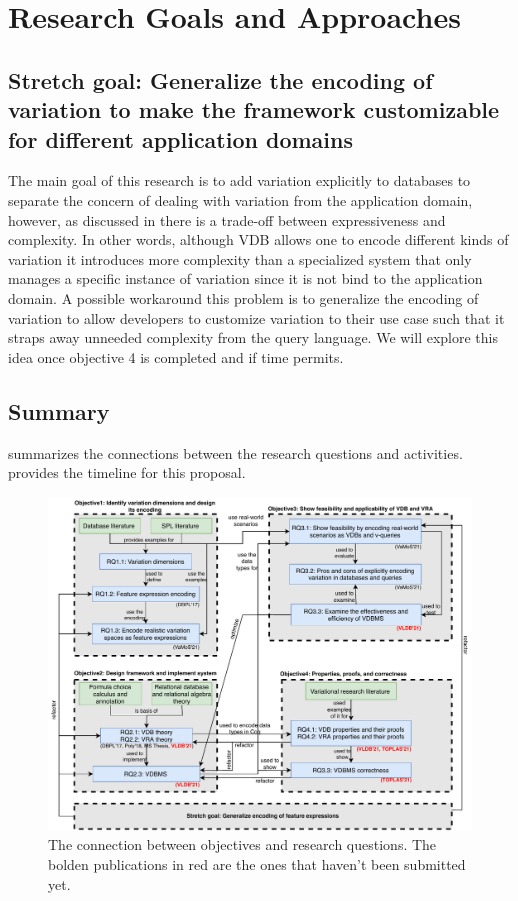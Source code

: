 \section{Research Goals and Approaches}
\label{sec:goals}







\subsection{Stretch goal: Generalize the encoding of variation to make the framework
customizable for different application domains}
\label{sec:ro5}

The main goal of this research is to add variation explicitly to 
databases to separate the concern of dealing with variation from the application
domain, however, as discussed in  there is a trade-off between 
 expressiveness and complexity. In other words, although VDB allows 
one to encode different kinds of variation it introduces more complexity than a
specialized system that only manages a specific instance of variation
since it is not bind to the application domain. 
A possible workaround this problem is to generalize the encoding of
variation to allow developers to customize variation to their use case such 
that it straps away unneeded complexity from the query language. We will 
explore this idea once objective 4 is completed and if time permits. 

\subsection{Summary}
\label{sec:sum}

 summarizes the connections between the research questions and activities.
 provides the timeline for this proposal.



\begin{figure}
\centering
\includegraphics[scale = 0.8] {figs/conn2.pdf}
\caption{The connection between objectives and research questions.
The bolden publications in red are the ones that haven't been submitted yet.}
\label{fig:conn}
\end{figure}

